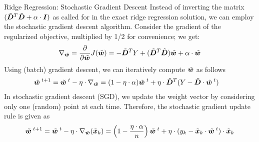 %
\begin{frame}{Ridge Regression: Stochastic Gradient Descent}
%
Instead of inverting the matrix $(\tilde{{\boldsymbol D}}^T\tilde{{\boldsymbol D}} + \alpha \cdot {\boldsymbol I})$ as
called for in the exact ridge regression solution, %
we can employ the stochastic
gradient descent algorithm.
Consider the gradient of the regularized objective,
multiplied by 1/2 for convenience; we
get:
\begin{align*}
    \nabla_{\tilde{{\boldsymbol w}}} = \frac{\partial}{\partial \tilde{{\boldsymbol w}}} J(\tilde{{\boldsymbol w}}) = 
     -\tilde{{\boldsymbol D}}^T Y + (\tilde{{\boldsymbol D}}^T\tilde{{\boldsymbol D}}) \tilde{{\boldsymbol w}} + \alpha \cdot \tilde{{\boldsymbol w}}
\end{align*}
Using (batch) gradient descent, we can iteratively compute $\tilde{{\boldsymbol w}}$ as follows
\begin{align*}
    \tilde{{\boldsymbol w}}^{\;t+1}  &= \tilde{{\boldsymbol w}}^{\;t} - \eta \cdot \nabla_{\tilde{{\boldsymbol w}}}
    = (1 - \eta \cdot \alpha) \tilde{{\boldsymbol w}}^{\;t} + \eta \cdot \tilde{{\boldsymbol D}}^T(Y - \tilde{{\boldsymbol D}}
    \cdot \tilde{{\boldsymbol w}}^{\;t})
\end{align*}
%
In stochastic gradient descent (SGD), we update the weight vector by
considering only one (random) point at each time. 
Therefore, the stochastic gradient update rule is given as
\begin{align*}
    \tilde{{\boldsymbol w}}^{\;t+1}  = \tilde{{\boldsymbol w}}^{\;t} - \eta \cdot \nabla_{\tilde{{\boldsymbol w}}}(\tilde{{\boldsymbol x}}_k)
     = \left(1 - \frac{\eta \cdot \alpha}{n}\right) \tilde{{\boldsymbol w}}^{\;t} 
    + \eta \cdot (y_k - \tilde{{\boldsymbol x}}_k \cdot \tilde{{\boldsymbol w}}^{\;t}) \cdot
    \tilde{{\boldsymbol x}}_k
\end{align*}
\end{frame}
%

